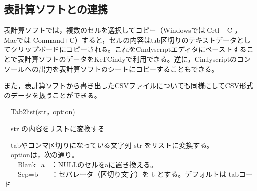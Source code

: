 \documentclass[papersize,a4paper,12pt,uplatex]{jsarticle}
\begin{document}
\newpage
\subsection{表計算ソフトとの連携}
表計算ソフトでは，複数のセルを選択してコピー（Windowsでは Crtl+ C ，Macでは Command+C）すると，セルの内容はtab区切りのテキストデータとしてクリップボードにコピーされる。これをCindyscriptエディタにペーストすることで表計算ソフトのデータをKeTCindyで利用できる。逆に，Cindyscriptのコンソールへの出力を表計算ソフトのシートにコピーすることもできる。

また，表計算ソフトから書き出したCSVファイルについても同様にしてCSV形式のデータを扱うことができる。

\begin{description}
\hypertarget{tab2list}{}
\item[関数]　Tab2list(str，option)
\item[機能]　str の内容をリストに変換する
\item[説明]　tabやコンマ区切りになっている文字列 str をリストに変換する。\\
　optionは，次の通り。\\
　　Blank=a　：NULLのセルをaに置き換える。\\
　　Sep=b　　：セパレータ（区切り文字）を b とする。デフォルトは tabコード\\


\end{description}
\end{document}
